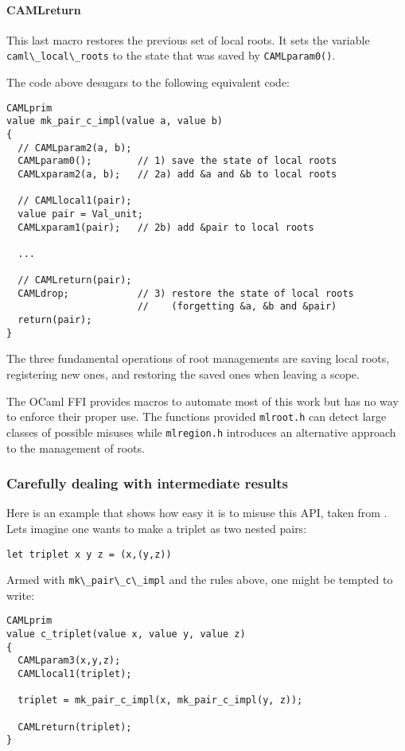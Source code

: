 \documentclass[a4paper]{easychair}
\newcommand{\cpp}[1]{\lstinline[style=C++]{#1}}
\begin{document}
\paragraph{CAMLreturn} This last macro restores the previous set of local
roots. It sets the variable \cpp{caml\_local\_roots} to the state that was
saved by \cpp{CAMLparam0()}.

The code above desugars to the following equivalent code:
%
\begin{lstlisting}[]
CAMLprim
value mk_pair_c_impl(value a, value b)
{
  // CAMLparam2(a, b);
  CAMLparam0();        // 1) save the state of local roots
  CAMLxparam2(a, b);   // 2a) add &a and &b to local roots

  // CAMLlocal1(pair);
  value pair = Val_unit;
  CAMLxparam1(pair);   // 2b) add &pair to local roots

  ...
  
  // CAMLreturn(pair);
  CAMLdrop;            // 3) restore the state of local roots
                       //    (forgetting &a, &b and &pair)
  return(pair);
}
\end{lstlisting}

The three fundamental operations of root managements are saving local roots,
registering new ones, and restoring the saved ones when leaving a scope.

The OCaml FFI provides macros to automate most of this work but has no way to
enforce their proper use. The functions provided \cpp{mlroot.h} can detect
large classes of possible misuses while \cpp{mlregion.h} introduces an
alternative approach to the management of roots. 

\subsubsection{Carefully dealing with intermediate results}

Here is an example that shows how easy it is to misuse this API, taken from
\citep[caml-oxide]{camloxide}.  Lets imagine one wants to make a triplet as two nested pairs:
%
\begin{lstlisting}[]
let triplet x y z = (x,(y,z))
\end{lstlisting}

Armed with \cpp{mk\_pair\_c\_impl} and the rules above, one might 
be tempted to write:
%
\begin{lstlisting}[style=C++]
CAMLprim
value c_triplet(value x, value y, value z)
{
  CAMLparam3(x,y,z);
  CAMLlocal1(triplet);

  triplet = mk_pair_c_impl(x, mk_pair_c_impl(y, z));

  CAMLreturn(triplet);
}
\end{lstlisting}
\end{document}

